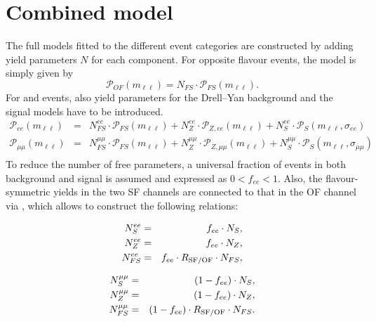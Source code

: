 \section{Combined model}
\label{sec:fullModel}
The full models fitted to the different event categories are constructed by adding yield parameters $N$ for each component. For opposite flavour events, the model is simply given by 
\begin{equation*}
 \mathcal{P}_{OF}(m_{\ell\ell}) = N_{FS} \cdot \mathcal{P}_{FS}(m_{\ell\ell}).
\end{equation*}
For \EE and \MM events, also yield parameters for the Drell--Yan background and the signal models have to be introduced. 
\begin{eqnarray*}
 {\mathcal{P}}_{ee}(m_{\ell\ell})     & = &  N_{FS}^{ee} \cdot {\mathcal{P}}_{FS}(m_{\ell\ell})      +  N_{Z}^{ee} \cdot {\mathcal{P}}_{Z,ee}(m_{\ell\ell})           +   N_{S}^{ee} \cdot  {\mathcal{P}}_{S}(m_{\ell\ell},\sigma_{ee}) \\
 {\mathcal{P}}_{\mu\mu}(m_{\ell\ell}) & = &   N_{FS}^{\mu\mu} \cdot {\mathcal{P}}_{FS}(m_{\ell\ell})  +  N_{Z}^{\mu\mu} \cdot {\mathcal{P}}_{Z,\mu\mu}(m_{\ell\ell})   +   N_{S}^{\mu\mu} \cdot {\mathcal{P}}_{S}(m_{\ell\ell},\sigma_{\mu\mu}) \\
\end{eqnarray*}
To reduce the number of free parameters, a universal fraction of \EE events in both background and signal is assumed and expressed as $0 < f_{ee} < 1$. Also, the flavour-symmetric yields in the two SF channels are connected to that in the OF channel via \Rsfof, which allows to construct the following relations:
\begin{center}
  \begin{minipage}[t]{0.49\textwidth}
\begin{eqnarray*}
 N_{S}^{ee} &=& f_{ee} \cdot N_{S}, \\
  N_{Z}^{ee} &=& f_{ee} \cdot N_{Z},\\
    N_{FS}^{ee} &=& f_{ee} \cdot R_{\text{SF/OF}} \cdot N_{FS}, \\
\end{eqnarray*}
  \end{minipage}
  \begin{minipage}[t]{0.49\textwidth}
\begin{eqnarray*}
 N_{S}^{\mu\mu} &=& (1-f_{ee}) \cdot N_{S}, \\
  N_{Z}^{\mu\mu} &=& (1-f_{ee}) \cdot N_{Z}, \\
    N_{FS}^{\mu\mu} &=& (1-f_{ee}) \cdot R_{\text{SF/OF}} \cdot N_{FS}. \\
\end{eqnarray*}
  \end{minipage}
\end{center}
